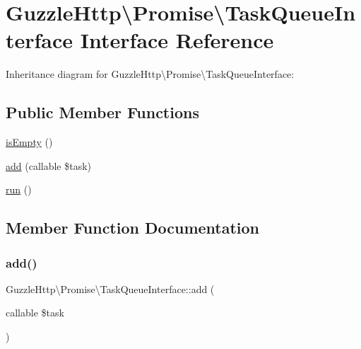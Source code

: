 \hypertarget{interfaceGuzzleHttp_1_1Promise_1_1TaskQueueInterface}{}\section{Guzzle\+Http\textbackslash{}Promise\textbackslash{}Task\+Queue\+Interface Interface Reference}
\label{interfaceGuzzleHttp_1_1Promise_1_1TaskQueueInterface}


Inheritance diagram for Guzzle\+Http\textbackslash{}Promise\textbackslash{}Task\+Queue\+Interface\+:
\subsection*{Public Member Functions}
\begin{DoxyCompactItemize}
\item 
\hyperlink{interfaceGuzzleHttp_1_1Promise_1_1TaskQueueInterface_ac979f0b2e52a8ef6d9fc3cc751873d7b}{is\+Empty} ()
\item 
\hyperlink{interfaceGuzzleHttp_1_1Promise_1_1TaskQueueInterface_a17ffca73eb81b58d2b5b17711563bf0b}{add} (callable \$task)
\item 
\hyperlink{interfaceGuzzleHttp_1_1Promise_1_1TaskQueueInterface_a237b20becf9d317b6092a8bc04ab27fc}{run} ()
\end{DoxyCompactItemize}


\subsection{Member Function Documentation}
\mbox{\label{interfaceGuzzleHttp_1_1Promise_1_1TaskQueueInterface_a17ffca73eb81b58d2b5b17711563bf0b}} 
\subsubsection{\texorpdfstring{add()}{add()}}
{\footnotesize\ttfamily Guzzle\+Http\textbackslash{}\+Promise\textbackslash{}\+Task\+Queue\+Interface\+::add (\begin{DoxyParamCaption}\item[{callable}]{\$task }\end{DoxyParamCaption})}

